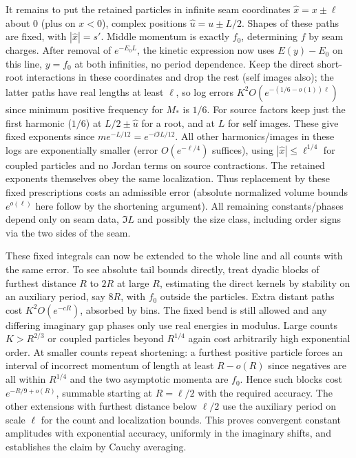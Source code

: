 \documentclass[11pt]{article}
\numberwithin{equation}{section}
\theoremstyle{definition}\newtheorem{definition}[theorem]{Definition}
\theoremstyle{remark}\newtheorem{remark}[theorem]{Remark}
\begin{document}
It remains to put the retained particles in infinite seam coordinates \(\hat x=x\pm\ell\) about 0 (plus on \(x<0\)), complex positions \(\hat u=u\pm L/2\). Shapes of these paths are fixed, with \(|\hat x|=s'\). Middle momentum is exactly \(f_0\), determining \(f\) by seam charges. After removal of \(e^{-E_0 L}\), the kinetic expression now uses \(E(y)-E_0\) on this line, \(y=f_0\) at both infinities, no period dependence. Keep the direct short-root interactions in these coordinates and drop the rest (self images also); the latter paths have real lengths at least \(\ell\), so log errors \(K^2 O(e^{-(1/6-o(1))\ell})\) since minimum positive frequency for \(M_*\) is \(1/6\). For source factors keep just the first harmonic (\(1/6\)) at \(L/2\pm\hat u\) for a root, and at \(L\) for self images. These give fixed exponents since \(m e^{-L/12}=e^{-i\Im L/12}\). All other harmonics/images in these logs are exponentially smaller (error \(O(e^{-\ell/4})\) suffices), using \(|\hat x|\le\ell^{1/4}\) for coupled particles and no Jordan terms on source contractions. The retained exponents themselves obey the same localization. Thus replacement by these fixed prescriptions costs an admissible error (absolute normalized volume bounds \(e^{o(\ell)}\) here follow by the shortening argument). All remaining constants/phases depend only on seam data, \(\Im L\) and possibly the size class, including order signs via the two sides of the seam.

These fixed integrals can now be extended to the whole line and all counts with the same error. To see absolute tail bounds directly, treat dyadic blocks of furthest distance \(R\) to \(2R\) at large \(R\), estimating the direct kernels by stability on an auxiliary period, say \(8R\), with \(f_0\) outside the particles. Extra distant paths cost \(K^2 O(e^{-cR})\), absorbed by bins. The fixed bend is still allowed and any differing imaginary gap phases only use real energies in modulus. Large counts \(K>R^{2/3}\) or coupled particles beyond \(R^{1/4}\) again cost arbitrarily high exponential order. At smaller counts repeat shortening: a furthest positive particle forces an interval of incorrect momentum of length at least \(R-o(R)\) since negatives are all within \(R^{1/4}\) and the two asymptotic momenta are \(f_0\). Hence such blocks cost \(e^{-R/9+o(R)}\), summable starting at \(R=\ell/2\) with the required accuracy. The other extensions with furthest distance below \(\ell/2\) use the auxiliary period on scale \(\ell\) for the count and localization bounds. This proves convergent constant amplitudes with exponential accuracy, uniformly in the imaginary shifts, and establishes the claim by Cauchy averaging.
\end{document}
